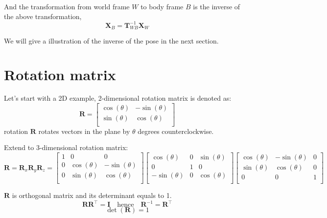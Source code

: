 \documentclass{article}
\begin{document}
And the transformation from world frame $W$ to body frame $B$ is the inverse of the above transformation,
\begin{equation}
    \mathbf{X}_B = \mathbf{T}_{WB}^{-1} \mathbf{X}_W
\end{equation}

We will give a illustration of the inverse of the pose in the next section.


\section{Rotation matrix}

Let's start with a 2D example, 2-dimensional rotation matrix is denoted as:
\begin{equation}
\mathbf{R} = 
\begin{bmatrix} 
\cos(\theta) & -\sin(\theta) \\
\sin(\theta) & \cos(\theta) \\
\end{bmatrix}   
\end{equation}
rotation $\mathbf{R}$ rotates vectors in the plane by $\theta$ degrees counterclockwise.

Extend to 3-dimensional rotation matrix:
\begin{equation}
\mathbf{R} = \mathbf{R}_x \mathbf{R}_y \mathbf{R}_z = 
\begin{bmatrix} 
1 & 0 & 0 \\
0 & \cos(\theta) & -\sin(\theta) \\
0 & \sin(\theta) & \cos(\theta) \\
\end{bmatrix}  
\begin{bmatrix} 
\cos(\theta) & 0 & \sin(\theta) \\
0 & 1 & 0 \\
-\sin(\theta) & 0 & \cos(\theta) \\
\end{bmatrix}  
\begin{bmatrix} 
\cos(\theta) & -\sin(\theta) & 0 \\
\sin(\theta) & \cos(\theta) & 0 \\
0 & 0 & 1 \\
\end{bmatrix}   
\end{equation}

$\mathbf{R}$ is orthogonal matrix and its determinant equals to 1.
\begin{equation}
    \mathbf{R}\mathbf{R}^{\top} = \mathbf{I} \quad \text{hence} \quad \mathbf{R}^{-1} = \mathbf{R}^{\top}
\end{equation}
\begin{equation}
    \det(\mathbf{R}) = 1
\end{equation}
\end{document}

